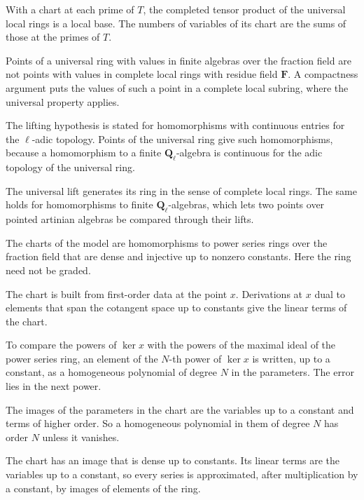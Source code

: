 With a chart at each prime of $T$, the completed tensor product of the universal local rings is a local base. The numbers of variables of its chart are the sums of those at the primes of $T$.

Points of a universal ring with values in finite algebras over the fraction field are not points with values in complete local rings with residue field $\mathbf F$. A compactness argument puts the values of such a point in a complete local subring, where the universal property applies.

The lifting hypothesis is stated for homomorphisms with continuous entries for the $\ell$-adic topology. Points of the universal ring give such homomorphisms, because a homomorphism to a finite $\mathbf Q_\ell$-algebra is continuous for the adic topology of the universal ring.

The universal lift generates its ring in the sense of complete local rings. The same holds for homomorphisms to finite $\mathbf Q_\ell$-algebras, which lets two points over pointed artinian algebras be compared through their lifts.

The charts of the model are homomorphisms to power series rings over the fraction field that are dense and injective up to nonzero constants. Here the ring need not be graded.

The chart is built from first-order data at the point $x$. Derivations at $x$ dual to elements that span the cotangent space up to constants give the linear terms of the chart.

To compare the powers of $\ker x$ with the powers of the maximal ideal of the power series ring, an element of the $N$-th power of $\ker x$ is written, up to a constant, as a homogeneous polynomial of degree $N$ in the parameters. The error lies in the next power.

The images of the parameters in the chart are the variables up to a constant and terms of higher order. So a homogeneous polynomial in them of degree $N$ has order $N$ unless it vanishes.

The chart has an image that is dense up to constants. Its linear terms are the variables up to a constant, so every series is approximated, after multiplication by a constant, by images of elements of the ring.

